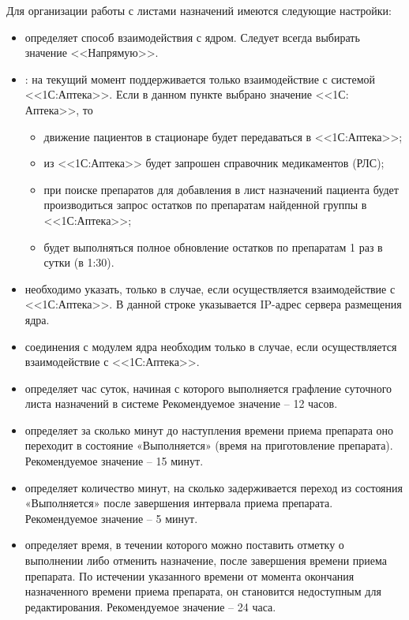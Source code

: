 Для организации работы с листами назначений имеются следующие настройки:
\begin{itemize}
 \item {} определяет способ взаимодействия с ядром. Следует всегда выбирать значение <<Напрямую>>.
 \item {}: на текущий момент поддерживается только взаимодействие с системой <<1С:Аптека>>. Если в данном пункте выбрано значение <<1С: Аптека>>, то
 \begin{itemize}
  \item движение пациентов в стационаре будет передаваться в <<1С:Аптека>>;
  \item из <<1С:Аптека>> будет запрошен справочник медикаментов (РЛС);
  \item при поиске препаратов для добавления в лист назначений пациента будет производиться запрос остатков по препаратам найденной группы в <<1С:Аптека>>;
  \item будет выполняться полное обновление остатков по препаратам 1 раз в сутки (в 1:30).
 \end{itemize} 
 \item {} необходимо указать, только в случае, если осуществляется взаимодействие с <<1С:Аптека>>. В данной строке указывается IP-адрес сервера размещения ядра.
 \item {} соединения с модулем ядра необходим только в случае, если осуществляется взаимодействие с <<1С:Аптека>>.
 \item {} определяет час суток, начиная с которого выполняется графление суточного листа назначений в системе Рекомендуемое значение – 12 часов.
 \item {} определяет за сколько минут до наступления времени приема препарата оно переходит в состояние «Выполняется» (время на приготовление препарата). Рекомендуемое значение – 15 минут.
 \item {} определяет количество минут, на сколько задерживается переход из состояния «Выполняется» после завершения интервала приема препарата. Рекомендуемое значение – 5 минут.
 \item {} определяет время, в течении которого можно поставить отметку о выполнении либо отменить назначение, после завершения времени приема препарата. По истечении указанного времени от момента окончания назначенного времени приема препарата, он становится недоступным для редактирования. Рекомендуемое значение – 24 часа.
\end{itemize} 

